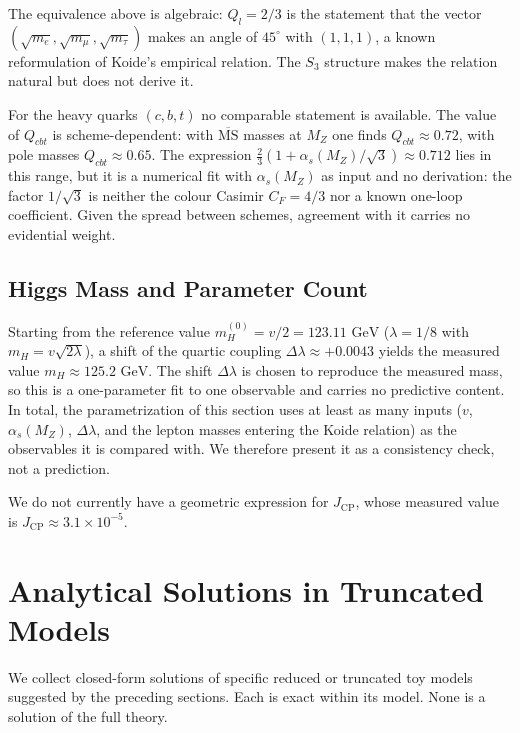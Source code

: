 \documentclass[11pt,a4paper,reqno]{amsart}
\theoremstyle{definition}
\numberwithin{equation}{section}
\begin{document}
The equivalence above is algebraic: $Q_l = 2/3$ is the statement that the vector $(\sqrt{m_e},\allowbreak\sqrt{m_\mu},\allowbreak\sqrt{m_\tau})$ makes an angle of $45^\circ$ with $(1,1,1)$, a known reformulation of Koide's empirical relation. The $S_3$ structure makes the relation natural but does not derive it.

For the heavy quarks $(c, b, t)$ no comparable statement is available. The value of $Q_{cbt}$ is scheme-dependent: with $\overline{\mathrm{MS}}$ masses at $M_Z$ one finds $Q_{cbt} \approx 0.72$, with pole masses $Q_{cbt} \approx 0.65$. The expression $\frac{2}{3}\left( 1 + \alpha_s(M_Z)/\sqrt{3} \right) \approx 0.712$ lies in this range, but it is a numerical fit with $\alpha_s(M_Z)$ as input and no derivation: the factor $1/\sqrt{3}$ is neither the colour Casimir $C_F = 4/3$ nor a known one-loop coefficient. Given the spread between schemes, agreement with it carries no evidential weight.

\subsection{Higgs Mass and Parameter Count}
Starting from the reference value $m_H^{(0)} = v/2 = 123.11\text{ GeV}$ ($\lambda = 1/8$ with $m_H = v\sqrt{2\lambda}$), a shift of the quartic coupling $\Delta\lambda \approx +0.0043$ yields the measured value $m_H \approx 125.2\text{ GeV}$. The shift $\Delta\lambda$ is chosen to reproduce the measured mass, so this is a one-parameter fit to one observable and carries no predictive content. In total, the parametrization of this section uses at least as many inputs ($v$, $\alpha_s(M_Z)$, $\Delta\lambda$, and the lepton masses entering the Koide relation) as the observables it is compared with. We therefore present it as a consistency check, not a prediction.

We do not currently have a geometric expression for $J_{\mathrm{CP}}$, whose measured value is $J_{\mathrm{CP}} \approx 3.1 \times 10^{-5}$.

\section{Analytical Solutions in Truncated Models}
\label{sec:analytical_solutions}

We collect closed-form solutions of specific reduced or truncated toy models suggested by the preceding sections. Each is exact within its model. None is a solution of the full theory.
\end{document}
